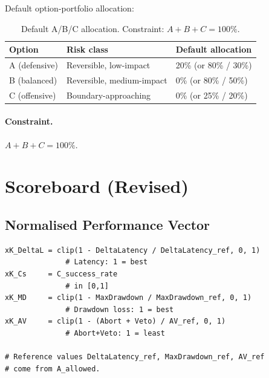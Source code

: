 Default option-portfolio allocation:

\begin{table}[ht]
\centering
\small
\begin{tabularx}{\linewidth}{lXX}
\toprule
\textbf{Option} & \textbf{Risk class} & \textbf{Default
allocation} \\
\midrule
A (defensive) & Reversible, low-impact & 20\% (or 80\% / 30\%) \\
B (balanced) & Reversible, medium-impact & 0\% (or 80\% / 50\%) \\
C (offensive) & Boundary-approaching & 0\% (or 25\% / 20\%) \\
\bottomrule
\end{tabularx}
\caption[Boundary contract A/B/C]{Default A/B/C allocation. Constraint:
$A + B + C = 100\%$.}
\label{tab:r1fix-abc-allocation}
\end{table}

\paragraph{Constraint.}
$A + B + C = 100\%$.

\section{Scoreboard (Revised)}
\label{sec:r1fix-scoreboard}


\subsection{Normalised Performance Vector}

\begin{lstlisting}[basicstyle=\ttfamily\small,frame=single]
xK_DeltaL = clip(1 - DeltaLatency / DeltaLatency_ref, 0, 1)
              # Latency: 1 = best
xK_Cs     = C_success_rate
              # in [0,1]
xK_MD     = clip(1 - MaxDrawdown / MaxDrawdown_ref, 0, 1)
              # Drawdown loss: 1 = best
xK_AV     = clip(1 - (Abort + Veto) / AV_ref, 0, 1)
              # Abort+Veto: 1 = least

# Reference values DeltaLatency_ref, MaxDrawdown_ref, AV_ref
# come from A_allowed.
\end{lstlisting}

